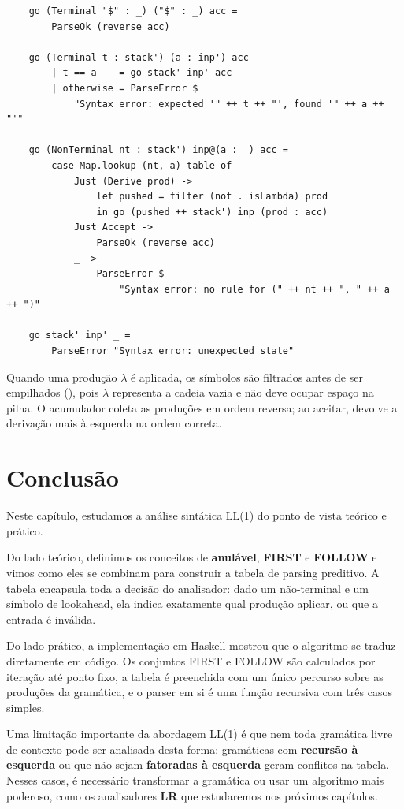 \begin{verbatim}
    go (Terminal "$" : _) ("$" : _) acc =
        ParseOk (reverse acc)

    go (Terminal t : stack') (a : inp') acc
        | t == a    = go stack' inp' acc
        | otherwise = ParseError $
            "Syntax error: expected '" ++ t ++ "', found '" ++ a ++ "'"

    go (NonTerminal nt : stack') inp@(a : _) acc =
        case Map.lookup (nt, a) table of
            Just (Derive prod) ->
                let pushed = filter (not . isLambda) prod
                in go (pushed ++ stack') inp (prod : acc)
            Just Accept ->
                ParseOk (reverse acc)
            _ ->
                ParseError $
                    "Syntax error: no rule for (" ++ nt ++ ", " ++ a ++ ")"

    go stack' inp' _ =
        ParseError "Syntax error: unexpected state"
\end{verbatim}

Quando uma produção \(\lambda\) é aplicada, os símbolos
 são filtrados antes de ser empilhados
(), pois \(\lambda\)
representa a cadeia vazia e não deve ocupar espaço na pilha. O
acumulador  coleta as produções em ordem
reversa; ao aceitar,  devolve a
derivação mais à esquerda na ordem correta.

\section{Conclusão}

Neste capítulo, estudamos a análise sintática LL(1) do ponto de vista
teórico e prático.

Do lado teórico, definimos os conceitos de \textbf{anulável},
\textbf{FIRST} e \textbf{FOLLOW} e vimos como eles se combinam para
construir a tabela de parsing preditivo. A tabela encapsula toda a
decisão do analisador: dado um não-terminal e um símbolo de
lookahead, ela indica exatamente qual produção aplicar, ou que a
entrada é inválida.

Do lado prático, a implementação em Haskell mostrou que o algoritmo
se traduz diretamente em código. Os conjuntos FIRST e FOLLOW são
calculados por iteração até ponto fixo, a tabela é preenchida com um
único percurso sobre as produções da gramática, e o parser em si é
uma função recursiva com três casos simples.

Uma limitação importante da abordagem LL(1) é que nem toda gramática
livre de contexto pode ser analisada desta forma: gramáticas com
\textbf{recursão à esquerda} ou que não sejam \textbf{fatoradas à
esquerda} geram conflitos na tabela. Nesses casos, é necessário
transformar a gramática ou usar um algoritmo mais poderoso, como
os analisadores \textbf{LR} que estudaremos nos próximos capítulos.

